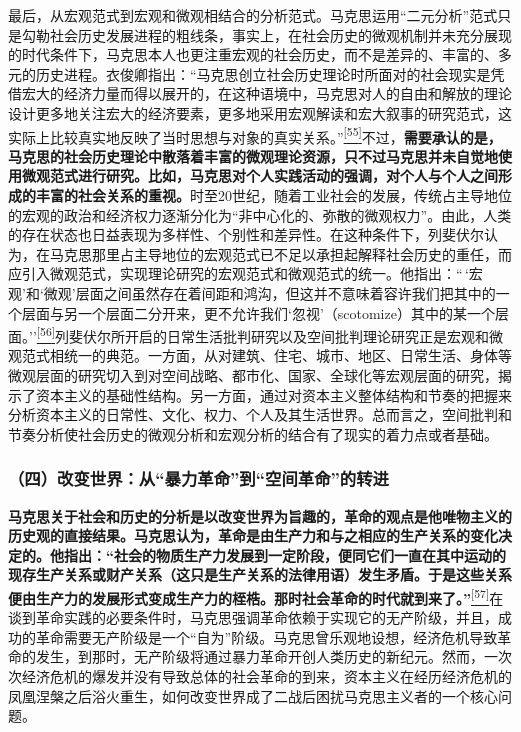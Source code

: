 \documentclass[UTF8, fontset = sourcesans, a4paper, oneside, zihao =
-4, scheme=chinese, no-math, space=true]{ctexbook}
\begin{document}
最后，从宏观范式到宏观和微观相结合的分析范式。马克思运用``二元分析''范式只是勾勒社会历史发展进程的粗线条，事实上，在社会历史的微观机制并未充分展现的时代条件下，马克思本人也更注重宏观的社会历史，而不是差异的、丰富的、多元的历史进程。衣俊卿指出：``马克思创立社会历史理论时所面对的社会现实是凭借宏大的经济力量而得以展开的，在这种语境中，马克思对人的自由和解放的理论设计更多地关注宏大的经济要素，更多地采用宏观解读和宏大叙事的研究范式，这实际上比较真实地反映了当时思想与对象的真实关系。''\protect\hypertarget{part0010_split_002.htmlux5cux23w55}{}{}\protect\hyperlink{part0010_split_002.htmlux5cux23m55}{\textsuperscript{{[}55{]}}}不过，\textbf{需要承认的是，马克思的社会历史理论中散落着丰富的微观理论资源，只不过马克思并未自觉地使用微观范式进行研究。比如，马克思对个人实践活动的强调，对个人与个人之间形成的丰富的社会关系的重视。}时至20世纪，随着工业社会的发展，传统占主导地位的宏观的政治和经济权力逐渐分化为``非中心化的、弥散的微观权力''。由此，人类的存在状态也日益表现为多样性、个别性和差异性。在这种条件下，列斐伏尔认为，在马克思那里占主导地位的宏观范式已不足以承担起解释社会历史的重任，而应引入微观范式，实现理论研究的宏观范式和微观范式的统一。他指出：``\,`宏观'和`微观'层面之间虽然存在着间距和鸿沟，但这并不意味着容许我们把其中的一个层面与另一个层面二分开来，更不允许我们`忽视'（scotomize）其中的某一个层面。''\protect\hypertarget{part0010_split_002.htmlux5cux23w56}{}{}\protect\hyperlink{part0010_split_002.htmlux5cux23m56}{\textsuperscript{{[}56{]}}}列斐伏尔所开启的日常生活批判研究以及空间批判理论研究正是宏观和微观范式相统一的典范。一方面，从对建筑、住宅、城市、地区、日常生活、身体等微观层面的研究切入到对空间战略、都市化、国家、全球化等宏观层面的研究，揭示了资本主义的基础性结构。另一方面，通过对资本主义整体结构和节奏的把握来分析资本主义的日常性、文化、权力、个人及其生活世界。总而言之，空间批判和节奏分析使社会历史的微观分析和宏观分析的结合有了现实的着力点或者基础。

\subsubsection{\texorpdfstring{（四）改变世界：从``暴力革命''到``空间革命''的转进}{（四）改变世界：从暴力革命到空间革命的转进}}\label{part0010_split_002.htmlux5cux23d042}

\textbf{马克思关于社会和历史的分析是以改变世界为旨趣的，革命的观点是他唯物主义的历史观的直接结果。马克思认为，革命是由生产力和与之相应的生产关系的变化决定的。他指出：``社会的物质生产力发展到一定阶段，便同它们一直在其中运动的现存生产关系或财产关系（这只是生产关系的法律用语）发生矛盾。于是这些关系便由生产力的发展形式变成生产力的桎梏。那时社会革命的时代就到来了。''}\protect\hypertarget{part0010_split_002.htmlux5cux23w57}{}{}\protect\hyperlink{part0010_split_002.htmlux5cux23m57}{\textsuperscript{{[}57{]}}}在谈到革命实践的必要条件时，马克思强调革命依赖于实现它的无产阶级，并且，成功的革命需要无产阶级是一个``自为''阶级。马克思曾乐观地设想，经济危机导致革命的发生，到那时，无产阶级将通过暴力革命开创人类历史的新纪元。然而，一次次经济危机的爆发并没有导致总体的社会革命的到来，资本主义在经历经济危机的凤凰涅槃之后浴火重生，如何改变世界成了二战后困扰马克思主义者的一个核心问题。
\end{document}

